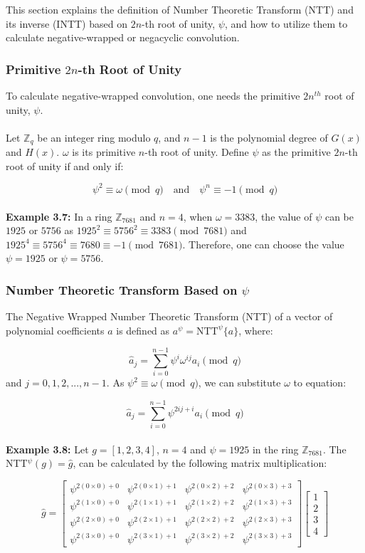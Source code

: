 \documentclass[12pt]{report}
\begin{document}
This section explains the definition of Number Theoretic Transform (NTT) and its inverse (INTT) based on $2n$-th root of unity, $\psi$, and how to utilize them to calculate negative-wrapped or negacyclic convolution.

\subsubsection{Primitive $2n$-th Root of Unity}

To calculate negative-wrapped convolution, one needs the primitive $2n^{th}$ root of unity, $\psi$.\\ \\
Let $\mathbb{Z}_q$ be an integer ring modulo $q$, and $n-1$ is the polynomial degree of $G(x)$ and $H(x)$. $\omega$ is its primitive $n$-th root of unity. Define $\psi$ as the primitive $2n$-th root of unity if and only if:

\[\psi^{2} \equiv \omega \pmod{q} \quad \text{and} \quad \psi^{n} \equiv -1 \pmod{q}\]
\\
\textbf{Example 3.7:} In a ring $\mathbb{Z}_{7681}$ and $n=4$, when $\omega=3383$, the value of $\psi$ can be $1925$ or $5756$ as $1925^{2} \equiv 5756^{2} \equiv 3383 \pmod{7681}$ and $1925^{4} \equiv 5756^{4} \equiv 7680 \equiv -1 \pmod{7681}$. Therefore, one can choose the value $\psi=1925$ or $\psi=5756$.

\subsubsection{Number Theoretic Transform Based on $\psi$}

The Negative Wrapped Number Theoretic Transform (NTT) of a vector of polynomial coefficients $a$ is defined as $a^{\psi} = \text{NTT}^{\psi}\{a\}$, where:

\[\hat{a}_{j}=\sum_{i=0}^{n-1}\psi^{i}\omega^{ij}a_{i} \pmod{q}\]
and $j=0,1,2,...,n-1.$ As $\psi^{2} \equiv \omega \pmod{q}$, we can substitute $\omega$ to equation:

\[\hat{a}_{j}=\sum_{i=0}^{n-1}\psi^{2ij+i}a_{i} \pmod{q}\] \\
\textbf{Example 3.8:} Let $g=[1,2,3,4]$, $n=4$ and $\psi=1925$ in the ring $\mathbb{Z}_{7681}$. The NTT$^{\psi}(g) = \hat{g}$, can be calculated by the following matrix multiplication:

\[\hat{g}=\begin{bmatrix}\psi^{2(0\times0)+0}&\psi^{2(0\times1)+1}&\psi^{2(0\times2)+2}&\psi^{2(0\times3)+3}\\ \psi^{2(1\times0)+0}&\psi^{2(1\times1)+1}&\psi^{2(1\times2)+2}&\psi^{2(1\times3)+3}\\ \psi^{2(2\times0)+0}&\psi^{2(2\times1)+1}&\psi^{2(2\times2)+2}&\psi^{2(2\times3)+3}\\ \psi^{2(3\times0)+0}&\psi^{2(3\times1)+1}&\psi^{2(3\times2)+2}&\psi^{2(3\times3)+3}\end{bmatrix}\begin{bmatrix}1\\ 2\\ 3\\ 4\end{bmatrix}\]
\end{document}
